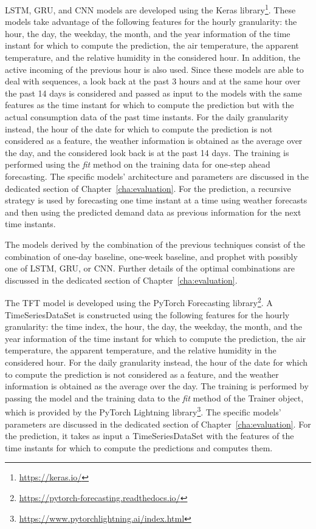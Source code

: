 LSTM, GRU, and CNN models are developed using the Keras library\footnote{ \url{https://keras.io/} }.
These models take advantage of the following features for the hourly granularity: the hour, the day, the weekday, the month, and the year information of the time instant for which to compute the prediction, the air temperature, the apparent temperature, and the relative humidity in the considered hour.
In addition, the active incoming of the previous hour is also used.
Since these models are able to deal with sequences, a look back at the past 3 hours and at the same hour over the past 14 days is considered and passed as input to the models with the same features as the time instant for which to compute the prediction but with the actual consumption data of the past time instants.
For the daily granularity instead, the hour of the date for which to compute the prediction is not considered as a feature, the weather information is obtained as the average over the day, and the considered look back is at the past 14 days.
The training is performed using the \emph{fit} method on the training data for one-step ahead forecasting.
The specific models' architecture and parameters are discussed in the dedicated section of Chapter~\ref{cha:evaluation}.
For the prediction, a recursive strategy is used by forecasting one time instant at a time using weather forecasts and then using the predicted demand data as previous information for the next time instants.

The models derived by the combination of the previous techniques consist of the combination of one-day baseline, one-week baseline, and prophet with possibly one of LSTM, GRU, or CNN.
Further details of the optimal combinations are discussed in the dedicated section of Chapter~\ref{cha:evaluation}.

The TFT model is developed using the PyTorch Forecasting library\footnote{ \url{https://pytorch-forecasting.readthedocs.io/} }.
A TimeSeriesDataSet is constructed using the following features for the hourly granularity: the time index, the hour, the day, the weekday, the month, and the year information of the time instant for which to compute the prediction, the air temperature, the apparent temperature, and the relative humidity in the considered hour.
For the daily granularity instead, the hour of the date for which to compute the prediction is not considered as a feature, and the weather information is obtained as the average over the day.
The training is performed by passing the model and the training data to the \emph{fit} method of the Trainer object, which is provided by the PyTorch Lightning library\footnote{ \url{https://www.pytorchlightning.ai/index.html} }.
The specific models' parameters are discussed in the dedicated section of Chapter~\ref{cha:evaluation}.
For the prediction, it takes as input a TimeSeriesDataSet with the features of the time instants for which to compute the predictions and computes them.


